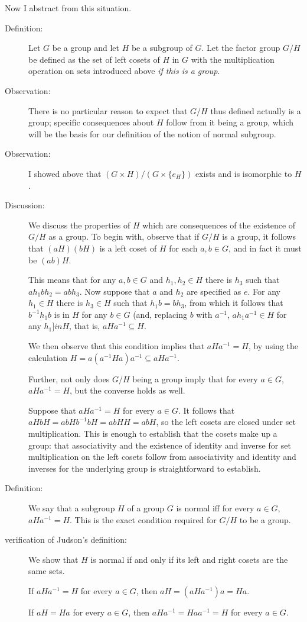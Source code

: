 \documentclass[12pt]{article}
\begin{document}
Now I abstract from this situation.

\begin{description}
\item[Definition:]  Let $G$ be a group and let $H$ be a subgroup of $G$.  Let the factor group $G/H$ be defined
as the set of left cosets of $H$ in $G$ with the multiplication operation on sets introduced above {\em if this is a group\/}.

\item[Observation:]  There is no particular reason to expect that $G/H$ thus defined actually is a group;  specific consequences about $H$ follow from it being a group, which will be the basis for our definition of the notion of normal subgroup.

\item[Observation:]  I showed above that $(G \times H)/(G \times \{e_H\})$ exists and is isomorphic to $H$.

\item[Discussion:]  We discuss the properties of $H$ which are consequences of the existence of $G/H$ as a group.
To begin with, observe that if $G/H$ is a group, it follows that $(aH)(bH)$ is a left coset of $H$ for each $a,b \in G$, and in fact it must be $(ab)H$.

This means that for any $a,b \in G$ and $h_1, h_2 \in H$ there is $h_3$ such that $ah_1bh_2 = abh_3$.  Now suppose that $a$ and $h_2$ are specified as $e$.  For any $h_1 \in H$ there is $h_3 \in H$ such that
$h_1b = bh_3$, from which it follows that $b^{-1}h_1b$ is in $H$ for any $b \in G$ (and, replacing $b$ with $a^{-1}$, $ah_1a^{-1} \in H$ for any $h_1 ]in H$, that is, $aHa^{-1} \subseteq H$.

We then observe that this condition implies that $aHa^{-1} = H$, by using the calculation $H = a(a^{-1}Ha)a^{-1} \subseteq aHa^{-1}$.

Further, not only does $G/H$ being a group imply that for every $a \in G$, $aHa^{-1} = H$, but the converse holds as well.

Suppose that $aHa^{-1} = H$ for every $a \in G$.  It follows that $aHbH = abHb^{-1}bH = abHH = abH$, so
the left cosets are closed under set multiplication.   This is enough to establish that the cosets make up a group:  that associativity and the existence of identity and inverse for set multiplication on the left cosets follow from associativity and identity and inverses for the underlying group is straightforward to establish.

\item[Definition:]  We say that a subgroup $H$ of a group $G$ is normal iff for every $a \in G$, $aHa^{-1} = H$.
This is the exact condition required for $G/H$ to be a group.

\item[verification of Judson's definition:]  We show that $H$ is normal if and only if its left and right cosets are the same sets.

If $aHa^{-1}=H$ for every $a \in G$, then $aH = (aHa^{-1})a = Ha$.

If $aH = Ha$ for every $a\in G$, then $aHa^{-1} = Haa^{-1} = H$ for every $a \in G$.


\end{description}
\end{document}
